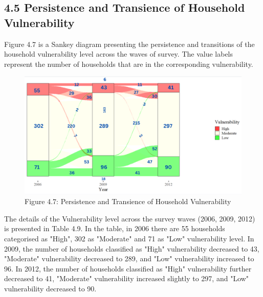 \documentclass[12pt, a4paper]{article}
\begin{document}
\subsection*{4.5 Persistence and Transience of Household Vulnerability}
\renewcommand{\thepage}{\arabic{page}}
Figure 4.7 is a Sankey diagram presenting the persistence and transitions of the household vulnerability level across the waves of survey. The value labels represent the number of households that are in the corresponding vulnerability. \\

\begin{figure}[H]
	\includegraphics[scale=0.6]{Sankey.png}
	\captionsetup{labelformat=empty}
	\caption{Figure 4.7: Persistence and Transience of Household Vulnerability}
	\setlength{\abovecaptionskip}{2pt}
	\label{fig:hviletecomponents}
\end{figure}

The details of the Vulnerability level across the survey waves (2006, 2009, 2012) is presented in Table 4.9. In the table, in 2006 there are 55 households categorised as "High", 302 as "Moderate" and 71 as "Low" vulnerability level. In 2009, the number of households classified as "High" vulnerability decreased to 43, "Moderate" vulnerability decreased to 289, and "Low" vulnerability increased to 96.
In 2012, the number of households classified as "High" vulnerability further decreased to 41, "Moderate" vulnerability increased slightly to 297, and "Low" vulnerability decreased to 90.
\end{document}

